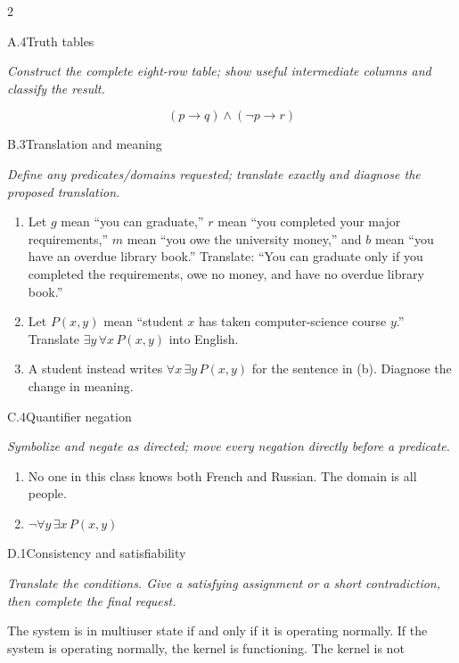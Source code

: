 \documentclass[9pt]{extarticle}
\begin{document}
\begin{multicols}{2}
\begin{CoreProblem}{A.4}{Truth tables}
{\scriptsize\textit{Construct the complete eight-row table; show useful intermediate columns and classify the result.}\par}
\[
  (p\to q)\land(\neg p\to r)
\]
\end{CoreProblem}
\begin{CoreProblem}{B.3}{Translation and meaning}
{\scriptsize\textit{Define any predicates/domains requested; translate exactly and diagnose the proposed translation.}\par}
\begin{enumerate}[label=(\alph*)]
  \item Let $g$ mean ``you can graduate,'' $r$ mean ``you completed your major
        requirements,'' $m$ mean ``you owe the university money,'' and $b$
        mean ``you have an overdue library book.'' Translate: ``You can
        graduate only if you completed the requirements, owe no money, and
        have no overdue library book.''
  \item Let $P(x,y)$ mean ``student $x$ has taken computer-science course
        $y$.'' Translate $\exists y\,\forall x\,P(x,y)$ into English.
  \item A student instead writes $\forall x\,\exists y\,P(x,y)$ for the
        sentence in (b). Diagnose the change in meaning.
\end{enumerate}
\end{CoreProblem}
\begin{CoreProblem}{C.4}{Quantifier negation}
{\scriptsize\textit{Symbolize and negate as directed; move every negation directly before a predicate.}\par}
\begin{enumerate}[label=(\alph*)]
  \item No one in this class knows both French and Russian. The domain is all
        people.
  \item $\neg\forall y\,\exists x\,P(x,y)$
\end{enumerate}
\end{CoreProblem}
\columnbreak
\begin{CoreProblem}{D.1}{Consistency and satisfiability}
{\scriptsize\textit{Translate the conditions. Give a satisfying assignment or a short contradiction, then complete the final request.}\par}
The system is in multiuser state if and only if it is operating normally. If
the system is operating normally, the kernel is functioning. The kernel is not

\end{CoreProblem}
\end{multicols}
\end{document}
